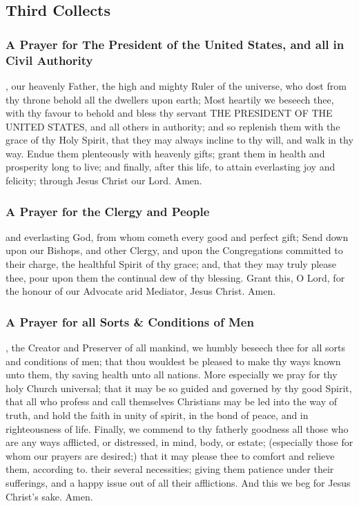 \subsection{Third Collects}
\subsubsection{A Prayer for The President of the United States, and all in Civil Authority}
, our heavenly Father, the high and mighty Ruler of the universe, who dost from thy throne behold all the dwellers upon earth; Most heartily we beseech thee, with thy favour to behold and bless thy servant THE PRESIDENT OF THE UNITED STATES, and all others in authority; and so replenish them with the grace of thy Holy Spirit, that they may always incline to thy will, and walk in thy way. Endue them plenteously with heavenly gifts; grant them in health and prosperity long to live; and finally, after this life, to attain everlasting joy and felicity; through Jesus Christ our Lord. Amen.
\subsubsection{A Prayer for the Clergy and People}
 and everlasting God, from whom cometh every good and perfect gift; Send down upon our Bishops, and other Clergy, and upon the Congregations committed to their charge, the healthful Spirit of thy grace; and, that they may truly please thee, pour upon them the continual dew of thy blessing. Grant this, O Lord, for the honour of our Advocate arid Mediator, Jesus Christ. Amen.
\subsubsection{A Prayer for all Sorts \& Conditions of Men}
, the Creator and Preserver of all mankind, we humbly beseech thee for all sorts and conditions of men; that thou wouldest be pleased to make thy ways known unto them, thy saving health unto all nations. More especially we pray for thy holy Church universal; that it may be so guided and governed by thy good Spirit, that all who profess and call themselves Christians may be led into the way of truth, and hold the faith in unity of spirit, in the bond of peace, and in righteousness of life. Finally, we commend to thy fatherly goodness all those who are any ways afflicted, or distressed, in mind, body, or estate; (especially those for whom our prayers are desired;) that it may please thee to comfort and relieve them, according to. their several necessities; giving them patience under their sufferings, and a happy issue out of all their afflictions. And this we beg for Jesus Christ's sake. Amen.
